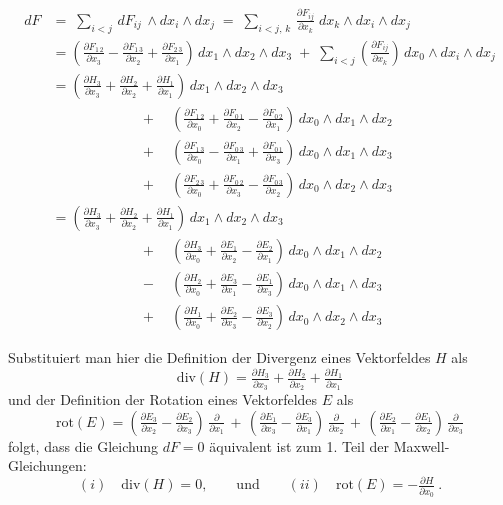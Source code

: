 \documentclass[%
	paper=a5,%
	fleqn,%
	DIV=18,%
	BCOR=0mm,
	fontsize=11pt,
	titlepage=false,%
	bibliography=totoc,
	DIV=18,%
	twoside=true,
	pdftitle=Riemannsche Geometrie,
	pdfauthor=Uwe Semmelmann,
	numbers=noendperiod]%
	{scrbook}
\begin{document}
$$
\begin{array}{rl}
d F  & =\; \sum_{i<j} \, dF_{ij} \, \wedge dx_i \wedge dx_j
\;=\; \sum_{i<j,\, k} \, \frac{\partial F_{ij}}{\partial x_k} \; dx_k \wedge dx_i \wedge dx_j \\[2ex]
& =
(\frac{\partial F_{1\,2}}{\partial x_3} - \frac{\partial F_{1\,3}}{\partial x_2} + \frac{\partial F_{2\,3}}{\partial x_1})\,
dx_1 \wedge dx_2 \wedge dx_3
\;+\;
\sum_{i<j} (\frac{\partial F_{ij}}{\partial x_k})\, dx_0 \wedge dx_i \wedge dx_j \\[2ex]
& =
(\frac{\partial H_3}{\partial x_3} + \frac{\partial H_2}{\partial x_2} + \frac{\partial H_1}{\partial x_1})\,
dx_1 \wedge dx_2 \wedge dx_3 \\[1.5ex]
& \phantom{xxxxxxxxxxx} + \quad
(\frac{\partial F_{1\,2}}{\partial x_0} + \frac{\partial F_{0\,1}}{\partial x_2} - \frac{\partial F_{0\,2}}{\partial x_1})\,
dx_0 \wedge dx_1 \wedge dx_2 \\[1.5ex]
& \phantom{xxxxxxxxxxx} + \quad
(\frac{\partial F_{1\,3}}{\partial x_0} - \frac{\partial F_{0\,3}}{\partial x_1} + \frac{\partial F_{0\,1}}{\partial x_3})\,
dx_0 \wedge dx_1 \wedge dx_3 \\[1.5ex]
& \phantom{xxxxxxxxxxx}  + \quad
(\frac{\partial F_{2\,3}}{\partial x_0} + \frac{\partial F_{0\,2}}{\partial x_3} - \frac{\partial F_{0\,3}}{\partial x_2})\,
dx_0 \wedge dx_2 \wedge dx_3 \\[2ex]
& =
(\frac{\partial H_3}{\partial x_3} + \frac{\partial H_2}{\partial x_2} + \frac{\partial H_1}{\partial x_1}) \,
dx_1 \wedge dx_2 \wedge dx_3 \\[1.5ex]
& \phantom{xxxxxxxxxxx} + \quad
(\frac{\partial H_3}{\partial x_0} + \frac{\partial E_1}{\partial x_2} - \frac{\partial E_2}{\partial x_1})\,
dx_0 \wedge dx_1 \wedge dx_2 \\[1.5ex]
& \phantom{xxxxxxxxxxx} - \quad
( \frac{\partial H_2}{\partial x_0} + \frac{\partial E_3}{\partial x_1} - \frac{\partial E_1}{\partial x_3})\,
dx_0 \wedge dx_1 \wedge dx_3 \\[1.5ex]
& \phantom{xxxxxxxxxxx}  + \quad
(\frac{\partial H_1}{\partial x_0} + \frac{\partial E_2}{\partial x_3} - \frac{\partial E_3}{\partial x_2})\,
dx_0 \wedge dx_2 \wedge dx_3
\end{array}
$$

Substituiert man hier die Definition der Divergenz eines Vektorfeldes $H$ als
$$
\mathrm{div}(H) = \tfrac{\partial H_3}{\partial x_3} + \tfrac{\partial H_2}{\partial x_2} + \tfrac{\partial H_1}{\partial x_1}
$$
und der Definition der Rotation eines Vektorfeldes $E$ als
$$
\mathrm{rot} (E) =
(\tfrac{\partial E_3}{\partial x_2} - \tfrac{\partial E_2}{\partial x_3}) \, \tfrac{\partial}{\partial x_1}
\,+\,
(\tfrac{\partial E_1}{\partial x_3} - \tfrac{\partial E_3}{\partial x_1}) \, \tfrac{\partial}{\partial x_2}
\,+\,
(\tfrac{\partial E_2}{\partial x_1} - \tfrac{\partial E_1}{\partial x_2}) \, \tfrac{\partial}{\partial x_3}
$$
folgt, dass die Gleichung $dF = 0$ \"aquivalent ist zum 1. Teil der Maxwell-Gleichungen:
$$
(i) \quad \mathrm{div} (H) = 0, \qquad \mbox{und} \qquad (ii) \quad \mathrm{rot} (E) = - \tfrac{\partial H}{\partial x_0} \ .
$$
\end{document}
